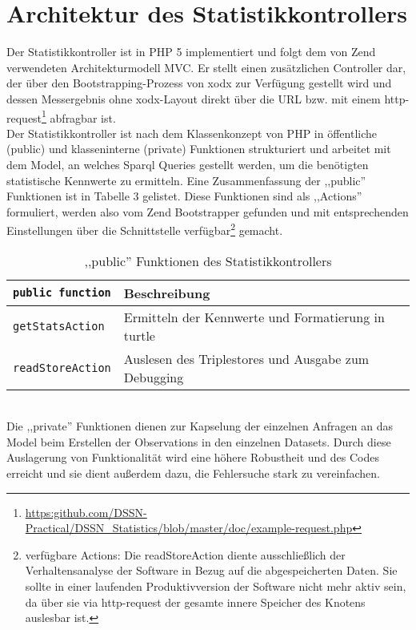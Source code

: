 \documentclass{article}
\begin{document}
\section{Architektur des Statistikkontrollers}
Der Statistikkontroller ist in PHP 5 implementiert und folgt dem von Zend verwendeten Architekturmodell MVC. Er stellt einen zusätzlichen Controller dar, der über den Bootstrapping-Prozess von xodx zur Verfügung gestellt wird und dessen Messergebnis ohne xodx-Layout direkt über die URL bzw. mit einem http-request\footnote{\url{https:github.com/DSSN-Practical/DSSN\_Statistics/blob/master/doc/example-request.php}} abfragbar ist.\\
Der Statistikkontroller ist nach dem Klassenkonzept von PHP in öffentliche (public) und klasseninterne (private) Funktionen strukturiert und arbeitet mit dem Model, an welches Sparql Queries gestellt werden, um die benötigten statistische Kennwerte zu ermitteln. Eine Zusammenfassung der ,,public'' Funktionen ist in Tabelle 3 gelistet. Diese Funktionen sind als ,,Actions'' formuliert, werden also vom Zend Bootstrapper gefunden und mit entsprechenden Einstellungen über die Schnittstelle verfügbar\footnote{verfügbare Actions: Die readStoreAction diente ausschließlich der Verhaltensanalyse der Software in Bezug auf die abgespeicherten Daten. Sie sollte in einer laufenden Produktivversion der Software nicht mehr aktiv sein, da über sie via http-request der gesamte innere Speicher des Knotens auslesbar ist.} gemacht.\\
\begin{table}[h!]
\centering
\label{table3}
\begin{tabular}{|l|l|}
\hline
\texttt{public function} & Beschreibung \\ \hline
\texttt{getStatsAction}       & Ermitteln der Kennwerte und Formatierung in turtle 	\\ \hline
\texttt{readStoreAction}      & Auslesen des Triplestores und Ausgabe zum Debugging	\\ \hline
\end{tabular}
\caption{,,public'' Funktionen des Statistikkontrollers}
\end{table}\\
Die ,,private'' Funktionen dienen zur Kapselung der einzelnen Anfragen an das Model beim Erstellen der Observations in den einzelnen Datasets. Durch diese Auslagerung von Funktionalität wird eine höhere Robustheit und des Codes erreicht und sie dient außerdem dazu, die Fehlersuche stark zu vereinfachen.
\end{document}
